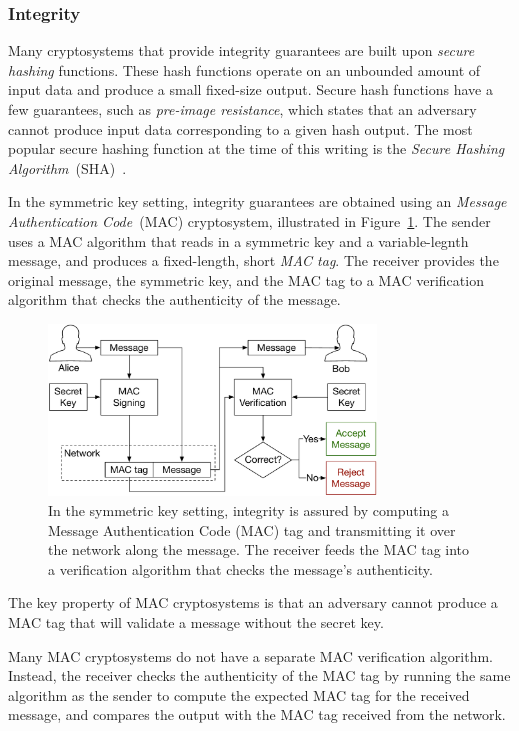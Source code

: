 \subsubsection{Integrity}
\label{sec:integrity_crypto}

Many cryptosystems that provide integrity guarantees are built upon
\textit{secure hashing} functions. These hash functions operate on an unbounded
amount of input data and produce a small fixed-size output. Secure hash
functions have a few guarantees, such as \textit{pre-image resistance}, which
states that an adversary cannot produce input data corresponding to a given
hash output. The most popular secure hashing function at the time of this
writing is the \textit{Secure Hashing Algorithm}~(SHA)~\cite{eastlake2001sha1}.

In the symmetric key setting, integrity guarantees are obtained using an
\textit{Message Authentication Code}~(MAC) cryptosystem, illustrated in
Figure~\ref{fig:symmetric_mac}. The sender uses a MAC algorithm that reads in a
symmetric key and a variable-legnth message, and produces a fixed-length, short
\textit{MAC tag}. The receiver provides the original message, the symmetric
key, and the MAC tag to a MAC verification algorithm that checks the
authenticity of the message.

\begin{figure}[hbt]
  \centering
  \includegraphics[width=87mm]{figures/symmetric_mac.pdf}
  \caption{
    In the symmetric key setting, integrity is assured by computing a
    Message Authentication Code (MAC) tag and transmitting it over the network
    along the message. The receiver feeds the MAC tag into a verification
    algorithm that checks the message's authenticity.
  }
  \label{fig:symmetric_mac}
\end{figure}

The key property of MAC cryptosystems is that an adversary cannot produce a
MAC tag that will validate a message without the secret key.

Many MAC cryptosystems do not have a separate MAC verification algorithm.
Instead, the receiver checks the authenticity of the MAC tag by running the
same algorithm as the sender to compute the expected MAC tag for the received
message, and compares the output with the MAC tag received from the network.

